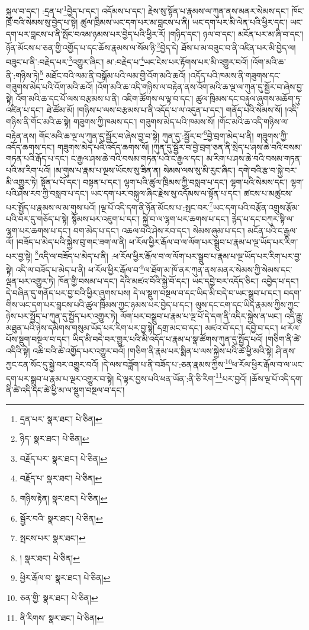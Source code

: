 སྐུལ་བ་དང་། :དྲན་པ་\footnote{དྲན་པར་  སྣར་ཐང་།  པེ་ཅིན། }བྱེད་པ་དང་། འདོམས་པ་དང་། རྗེས་སུ་སྟོན་པ་རྣམས་ལ་ཀུན་ནས་མནར་སེམས་དང་། ཁོང་ཁྲོ་བའི་སེམས་སུ་བྱེད་པ་སྟེ། ཚུལ་ཁྲིམས་ཡང་དག་པར་མ་བླངས་པ་ནི། ཡང་དག་པར་མི་ལེན་པའི་ཕྱིར་དང་། ཡང་དག་པར་བླངས་པ་ནི་སྤོང་བའམ་ཉམས་པར་བྱེད་པའི་ཕྱིར་རོ། །གཉིད་དང་། ཉལ་བ་དང་། མངོན་པར་མ་ཞི་བ་དང་། ཉོན་མོངས་པ་ཅན་གྱི་འགྱོད་པ་དང་ཆོས་རྣམས་ལ་སོམ་ཉི་\footnote{ཉིད་  སྣར་ཐང་།  པེ་ཅིན། }བྱེད་དེ། ཐོས་པ་མ་བཟུང་བ་ནི་འཛིན་པར་མི་བྱེད་ལ། བཟུང་པ་ནི་:བརྗེད་པར་\footnote{བརྗོད་པར་  སྣར་ཐང་།  པེ་ཅིན། }འགྱུར་ཞིང་། མ་:བརྗེད་པ་\footnote{བརྗོད་པ་  སྣར་ཐང་།  པེ་ཅིན། }ཡང་ངེས་པར་རྟོགས་པར་མི་འགྱུར་བའོ། །འོག་མའི་ཆ་ནི་:གཉིས་ཏེ།\footnote{གཉིས་རྟེན།  སྣར་ཐང་།  པེ་ཅིན། } མཐོང་བའི་ལམ་ནི་བསྒོམ་པའི་ལམ་གྱི་འོག་མའི་ཆའོ། །འདོད་པའི་ཁམས་ནི་གཟུགས་དང་གཟུགས་མེད་པའི་འོག་མའི་ཆའོ། །འོག་མའི་ཆ་འདི་གཉིས་ལ་བརྟེན་ནས་འོག་མའི་ཆ་ལྔ་ལ་ཀུན་དུ་སྦྱོར་བ་ཞེས་བྱ་སྟེ། འོག་མའི་ཆ་དང་པོ་ལས་བརྩམས་པ་ནི། འཇིག་ཚོགས་ལ་ལྟ་བ་དང་། ཚུལ་ཁྲིམས་དང་བརྟུལ་ཞུགས་མཆོག་ཏུ་འཛིན་པ་དང་། ཐེ་ཚོམ་མོ། །གཉིས་པ་ལས་བརྩམས་པ་ནི་འདོད་པ་ལ་འདུན་པ་དང་། གནོད་པའི་སེམས་སོ། །འདི་གཉིས་ནི་གོང་མའི་ཆ་སྟེ། གཟུགས་ཀྱི་ཁམས་དང་། གཟུགས་མེད་པའི་ཁམས་སོ། །གོང་མའི་ཆ་འདི་གཉིས་ལ་བརྟེན་ནས། གོང་མའི་ཆ་ལྔ་ལ་ཀུན་དུ་སྦྱོར་བ་ཞེས་བྱ་བ་སྟེ། ཀུན་དུ་:སྦྱོར་བ་\footnote{སྦྱོར་བའི་  སྣར་ཐང་།  པེ་ཅིན། }བྱེ་བྲག་མེད་པ་ནི། གཟུགས་ཀྱི་འདོད་ཆགས་དང་། གཟུགས་མེད་པའི་འདོད་ཆགས་སོ། །ཀུན་དུ་སྦྱོར་བ་བྱེ་བྲག་ཅན་ནི་སྲེད་པ་ཤས་ཆེ་བའི་བསམ་གཏན་པའི་རྒོད་པ་དང་། ང་རྒྱལ་ཤས་ཆེ་བའི་བསམ་གཏན་པའི་ང་རྒྱལ་དང་། མ་རིག་པ་ཤས་ཆེ་བའི་བསམ་གཏན་པའི་མ་རིག་པའོ། །མ་གུས་པ་རྣམ་པ་ལྔས་ཡོངས་སུ་ཟིན་ན། སེམས་ལས་སུ་མི་རུང་ཞིང་། དགེ་བའི་རྩ་བ་སྐྱེ་བར་མི་འགྱུར་ཏེ། སྟོན་པ་པོ་དང་། བསྟན་པ་དང་། ལྷག་པའི་ཚུལ་ཁྲིམས་ཀྱི་བསླབ་པ་དང་། ལྷག་པའི་སེམས་དང་། ལྷག་པའི་ཤེས་རབ་ཀྱི་བསླབ་པ་དང་། ཡང་དག་པར་བསྐུལ་ཞིང་རྗེས་སུ་འདོམས་ལ་སྟོན་པ་དང་། ཚངས་པ་མཚུངས་པར་སྤྱོད་པ་རྣམས་ལ་མ་གུས་པའོ། །ལྔ་པོ་འདི་དག་ནི་ཉོན་མོངས་པ་:སྤང་བར་\footnote{སྤངས་པར་  སྣར་ཐང་། }ཡང་དག་པའི་བརྩོན་འགྲུས་རྩོམ་པའི་བར་དུ་གཅོད་པ་སྟེ། སྙོམས་པར་འཇུག་པ་དང་། སྐྱེ་བ་ལ་ལྷག་པར་ཆགས་པ་དང་། རྙེད་པ་དང་བཀུར་སྟི་ལ་ལྷག་པར་ཆགས་པ་དང་། བག་མེད་པ་དང་། འཆལ་བའི་ཤེས་རབ་དང་། སེམས་ཞུམ་པ་དང་། མངོན་པའི་ང་རྒྱལ་ལོ། །བཟོད་པ་མེད་པའི་སྐྱེས་བུ་གང་ཟག་ལ་ནི། ཕ་རོལ་ཕྱིར་རྒོལ་བ་ལ་ལོག་པར་སྒྲུབ་པ་རྣམ་པ་ལྔ་ཡོད་པར་རིག་པར་བྱ་སྟེ། \footnote{།    སྣར་ཐང་།  པེ་ཅིན། }འདི་ལ་བཟོད་པ་མེད་པ་ནི། :ཕ་རོལ་ཕྱིར་རྒོལ་བ་ལ་ལོག་པར་སྒྲུབ་པ་རྣམ་པ་ལྔ་ཡོད་པར་རིག་པར་བྱ་སྟེ། འདི་ལ་བཟོད་པ་མེད་པ་ནི། ཕ་རོལ་ཕྱིར་རྒོལ་བ་\footnote{ཕྱིར་རྒོལ་བ་  སྣར་ཐང་།  པེ་ཅིན། }ལ་ཐོག་མ་ཁོ་ནར་ཀུན་ནས་མནར་སེམས་ཀྱི་སེམས་དང་ལྡན་པར་འགྱུར་ཏེ། ཁོན་གྱི་བསམ་པ་དང་། དེའི་མཛའ་བོའི་སྐྱེ་བོ་དང་། ཡང་དབྱེ་བར་འདོད་ཅིང་། འབྱེད་པ་དང་། དེ་བཞིན་དུ་གནོད་པར་བྱ་བའི་ཕྱིར་ཞུགས་པས། དེ་ལ་སྡུག་བསྔལ་བ་དང་ཡིད་མི་བདེ་བ་ཡང་སྒྲུབ་པ་དང་། བདག་གིས་ཡང་དག་པར་བླངས་པའི་ཚུལ་ཁྲིམས་ཀྱང་ཉམས་པར་བྱེད་པ་དང་། ལུས་དང་ངག་དང་ཡིད་རྣམས་ཀྱིས་ཀྱང་ཉེས་པར་སྤྱོད་པ་ཀུན་དུ་སྤྱོད་པར་འགྱུར་ཏེ། ལོག་པར་བསྒྲུབ་པ་རྣམ་པ་ལྔ་པོ་དེ་དག་ནི་འདིར་སྐྱེས་ན་ཡང་། འདི་རྒྱུ་མཐུན་པའི་ཉེས་དམིགས་གསུམ་ཡོད་པར་རིག་པར་བྱ་སྟེ། དགྲ་མང་བ་དང་། མཛའ་བོ་དང་། དབྱེ་བ་དང་། ཕ་རོལ་པོས་སྡུག་བསྔལ་བ་དང་། ཡིད་མི་བདེ་བར་གྱུར་པའི་མི་འདོད་པ་རྣམ་པ་སྣ་ཚོགས་ཀུན་དུ་སྤྱོད་པའོ། །གཅིག་ནི་ཚེ་འདིའི་སྟེ། འཆི་བའི་ཚེ་འགྱོད་པར་འགྱུར་བའོ། །གཅིག་ནི་རྣམ་པར་སྨིན་པ་ལས་སྐྱེས་པའི་ཚེ་ཕྱི་མའི་སྟེ། ཤི་ནས་ཀྱང་ངན་སོང་དུ་སྐྱེ་བར་འགྱུར་བའོ། །དེ་ལས་བཟློག་པ་ནི་བཟོད་པ་:ཅན་རྣམས་ཀྱིས་\footnote{ཅན་གྱི་  སྣར་ཐང་།  པེ་ཅིན། }ཕ་རོལ་ཕྱིར་རྒོལ་བ་ལ་ཡང་དག་པར་སྒྲུབ་པ་རྣམ་པ་ལྔར་འགྱུར་བ་སྟེ། དེ་ལྟར་བྱས་པའི་ཕན་ཡོན་:ནི་ཅི་རིག་\footnote{ནི་རིགས་  སྣར་ཐང་།  པེ་ཅིན། }པར་བྱའོ། །ཆོས་ལྔ་པོ་འདི་དག་ནི་ཚེ་འདི་དང་ཚེ་ཕྱི་མ་ལ་སྡུག་བསྔལ་བ་དང་། 